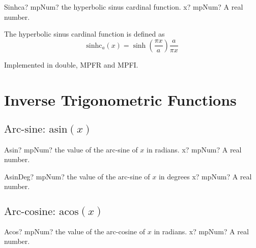 \begin{mpFunctionsExtract}
	\mpFunctionOne
	{Sinhca? mpNum? the hyperbolic sinus cardinal function.}
	{x? mpNum? A real number.}
\end{mpFunctionsExtract}

\vspace{0.3cm}
The hyperbolic sinus cardinal function is defined as
\begin{equation}
	\text{sinhc}_a(x) = \sinh \left( \frac{\pi x}{a} \right) \frac{a}{\pi x}
\end{equation}

Implemented in double, MPFR and MPFI.












\section{Inverse Trigonometric Functions}
\label{InverseTrigonometricFunctions}


\subsection{\texorpdfstring{$\text{Arc-sine: asin}(x)$}{asin}}

\begin{mpFunctionsExtract}
	\mpFunctionOne
	{Asin? mpNum? the value of the arc-sine of $x$ in radians.}
	{x? mpNum? A real number.}
\end{mpFunctionsExtract}

\vspace{0.6cm}

\begin{mpFunctionsExtract}
	\mpFunctionOne
	{AsinDeg? mpNum? the value of the arc-sine of $x$ in degrees}
	{x? mpNum? A real number.}
\end{mpFunctionsExtract}





\subsection{\texorpdfstring{$\text{Arc-cosine: acos}(x)$}{acos}}

\begin{mpFunctionsExtract}
	\mpFunctionOne
	{Acos? mpNum? the value of the arc-cosine of $x$ in radians.}
	{x? mpNum? A real number.}
\end{mpFunctionsExtract}

